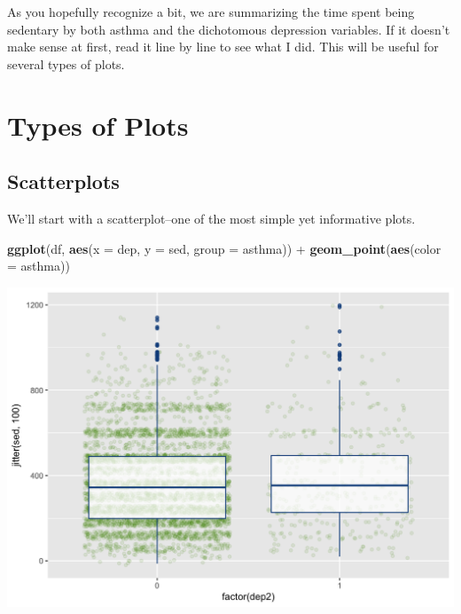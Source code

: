 \documentclass[]{tufte-book}
\newenvironment{Shaded}{}{}
\newcommand{\KeywordTok}[1]{\textcolor[rgb]{0.00,0.44,0.13}{\textbf{#1}}}
\newcommand{\DataTypeTok}[1]{\textcolor[rgb]{0.56,0.13,0.00}{#1}}
\newcommand{\StringTok}[1]{\textcolor[rgb]{0.25,0.44,0.63}{#1}}
\newcommand{\OperatorTok}[1]{\textcolor[rgb]{0.40,0.40,0.40}{#1}}
\newcommand{\NormalTok}[1]{#1}
\theoremstyle{definition}
\theoremstyle{definition}
\theoremstyle{remark}
\begin{document}
As you hopefully recognize a bit, we are summarizing the time spent
being sedentary by both asthma and the dichotomous depression variables.
If it doesn't make sense at first, read it line by line to see what I
did. This will be useful for several types of plots.

\section*{Types of Plots}\label{types-of-plots}

\subsection*{Scatterplots}\label{scatterplots}

We'll start with a scatterplot--one of the most simple yet informative
plots.

\begin{Shaded}
\begin{Highlighting}[]
\KeywordTok{ggplot}\NormalTok{(df, }\KeywordTok{aes}\NormalTok{(}\DataTypeTok{x =}\NormalTok{ dep, }\DataTypeTok{y =}\NormalTok{ sed, }\DataTypeTok{group =}\NormalTok{ asthma)) }\OperatorTok{+}\StringTok{ }
\StringTok{    }\KeywordTok{geom_point}\NormalTok{(}\KeywordTok{aes}\NormalTok{(}\DataTypeTok{color =}\NormalTok{ asthma))}
\end{Highlighting}
\end{Shaded}

\includegraphics{_main_files/figure-latex/unnamed-chunk-139-1}
\end{document}
